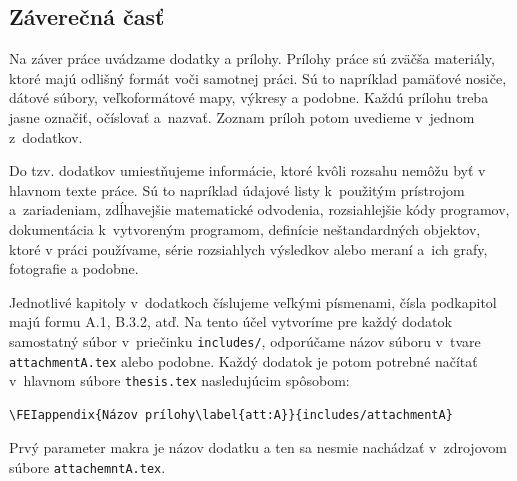 \documentclass[../../../thesis.tex]{subfiles}
\begin{document}
\subsection{Záverečná časť}
Na záver práce uvádzame dodatky a prílohy.
Prílohy práce sú zväčša materiály,
ktoré majú odlišný formát voči samotnej práci.
Sú to napríklad pamäťové nosiče,
dátové súbory, veľkoformátové mapy, výkresy a podobne.
Každú prílohu treba jasne označiť, očíslovať a~nazvať.
Zoznam príloh potom uvedieme v~jednom z~dodatkov.

Do tzv. dodatkov umiestňujeme informácie,
ktoré kvôli rozsahu nemôžu byť v hlavnom texte práce.
Sú to napríklad údajové listy k~použitým prístrojom
a~zariadeniam, zdĺhavejšie matematické odvodenia,
rozsiahlejšie kódy programov, dokumentácia
k~vytvoreným programom, definície neštandardných objektov,
ktoré v práci používame,
série rozsiahlych výsledkov alebo meraní
a~ich grafy, fotografie a podobne.

Jednotlivé kapitoly v~dodatkoch číslujeme veľkými písmenami, čísla podkapitol majú formu A.1, B.3.2, atď.
Na tento účel vytvoríme pre každý dodatok samostatný súbor v~priečinku \verb|includes/|, odporúčame názov súboru v~tvare \verb|attachmentA.tex| alebo podobne.
Každý dodatok je potom potrebné načítať v~hlavnom súbore \verb|thesis.tex| nasledujúcim spôsobom:
\begin{verbatim}
\FEIappendix{Názov prílohy\label{att:A}}{includes/attachmentA}
\end{verbatim}
Prvý parameter makra je názov dodatku a ten sa nesmie nachádzať v~zdrojovom súbore \verb|attachemntA.tex|.
\end{document}
